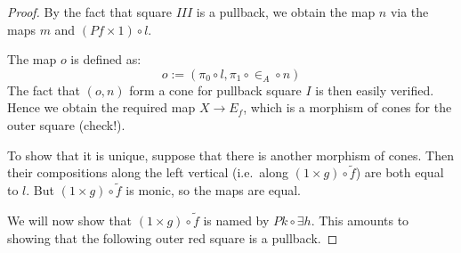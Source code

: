 \documentclass{article}
\begin{document}
\begin{proof}

  By the fact that square $III$ is a pullback, we obtain
  the map $n$ via the maps $m$ and $(Pf \times 1) \circ l$.

  The map $o$ is defined as:
  \[
    o := \left ( \pi_0 \circ l , \pi_1 \circ \in_A \circ n \right )
  \]
  The fact that $(o,n)$ form a cone for pullback square $I$ is then
  easily verified.
  Hence we obtain the required map $X \to E_f$, which is a morphism of
  cones for the outer square (check!).

  To show that it is unique, suppose that there is another morphism of
  cones.
  Then their compositions along the left vertical (i.e.\ along $(1
  \times g) \circ \tilde{f}$) are both equal to $l$.
  But $(1 \times g) \circ \tilde{f}$ is monic, so the maps are equal.

  \medskip

  We will now show that $(1 \times g) \circ \tilde{f}$ is named by
  $Pk \circ \exists h$.
  This amounts to showing that the following outer red square is a
  pullback.


\end{proof}
\end{document}
